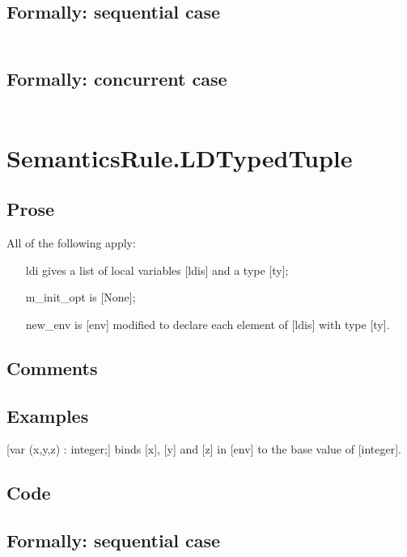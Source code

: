 \documentclass{book}
\begin{document}
  \subsection{Formally: sequential case}
  \begin{align}
  \end{align} 

  \subsection{Formally: concurrent case}
  \begin{align}
  \end{align} 

\section{SemanticsRule.LDTypedTuple \label{sec:SemanticsRule.LDTypedTuple}}

    \subsection{Prose}
    All of the following apply:
    \begin{itemize}
    \item [ldi] gives a list of local variables [ldis] and a type [ty];
    \item [m\_init\_opt] is [None];
    \item [new\_env] is [env] modified to declare each element of [ldis] with type
      [ty].
    \end{itemize}

    \subsection{Comments}

    \subsection{Examples}
    [var (x,y,z) : integer;] binds [x], [y] and [z] in [env] to the base value
    of [integer].

  \subsection{Code}

  \subsection{Formally: sequential case}
  \begin{align}
  \end{align} 
\end{document}
